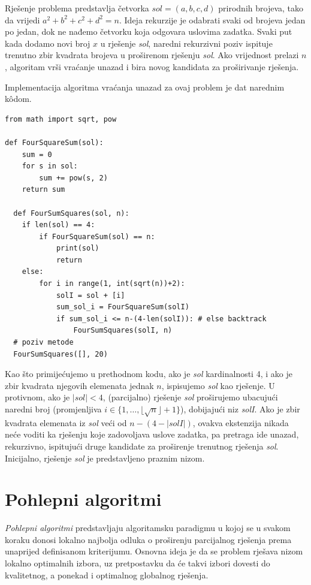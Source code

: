 \begin{solution}
	Rješenje problema predstavlja četvorka $sol = (a, b, c, d)$ prirodnih brojeva, tako da vrijedi $a^2 + b^2 + c^2 + d^2 = n$. Ideja rekurzije je odabrati svaki  od brojeva jedan po jedan, dok ne nađemo četvorku koja odgovara uslovima zadatka. Svaki put kada dodamo novi broj $x$ u rješenje \emph{sol}, naredni rekurzivni poziv ispituje trenutno zbir kvadrata brojeva u proširenom rješenju \emph{sol}. Ako vrijednost prelazi $n$, algoritam vrši vraćanje unazad i bira novog kandidata za proširivanje rješenja. 
	
 Implementacija algoritma vraćanja unazad za ovaj problem je dat narednim k\^odom.
 
 \begin{verbatim}
from math import sqrt, pow

def FourSquareSum(sol):
	sum = 0
	for s in sol:
		sum += pow(s, 2)
	return sum

  def FourSumSquares(sol, n):
	if len(sol) == 4:
		if FourSquareSum(sol) == n:
			print(sol)
			return 
	else:
		for i in range(1, int(sqrt(n))+2):
			solI = sol + [i]
			sum_sol_i = FourSquareSum(solI)
			if sum_sol_i <= n-(4-len(solI)): # else backtrack  
				FourSumSquares(solI, n) 
  # poziv metode
  FourSumSquares([], 20)
 \end{verbatim}
	
	Kao što primijećujemo u prethodnom kodu, ako je \emph{sol} kardinalnosti 4, i ako je zbir kvadrata njegovih elemenata jednak $n$, ispisujemo \emph{sol} kao rješenje. U protivnom, ako je $|sol|<4$, (parcijalno) rješenje \emph{sol} proširujemo ubacujući naredni broj (promjenljiva $i\in \{1, \ldots, \lfloor\sqrt{n} \rfloor + 1 \}$), dobijajući niz \emph{solI}.  Ako je zbir kvadrata elemenata iz \emph{sol} veći od $n-(4 - |solI|)$, ovakva ekstenzija nikada neće voditi ka rješenju koje zadovoljava uslove zadatka, pa pretraga ide unazad, rekurzivno,  ispitujući druge kandidate za proširenje trenutnog rješenja \emph{sol}. Inicijalno, rješenje \emph{sol} je predstavljeno praznim nizom.
	 
\end{solution}
 
 
\section{Pohlepni algoritmi}

\textit{Pohlepni algoritmi}  predstavljaju algoritamsku paradigmu u kojoj se u svakom koraku donosi lokalno najbolja odluka o proširenju parcijalnog rješenja prema unaprijed definisanom kriterijumu. Osnovna ideja je da se problem rješava nizom lokalno optimalnih izbora, uz pretpostavku da će takvi izbori dovesti do kvalitetnog, a ponekad i optimalnog globalnog rješenja.

